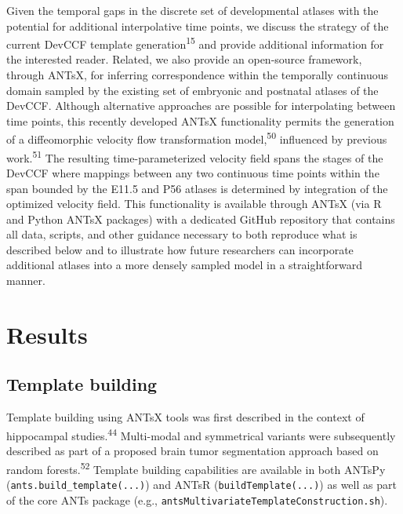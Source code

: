 \documentclass[
  12pt,
]{article}
\begin{document}
Given the temporal gaps in the discrete set of developmental atlases
with the potential for additional interpolative time points, we discuss
the strategy of the current DevCCF template
generation\textsuperscript{15} and provide additional information for
the interested reader. Related, we also provide an open-source
framework, through ANTsX, for inferring correspondence within the
temporally continuous domain sampled by the existing set of embryonic
and postnatal atlases of the DevCCF. Although alternative approaches are
possible for interpolating between time points, this recently developed
ANTsX functionality permits the generation of a diffeomorphic velocity
flow transformation model,\textsuperscript{50} influenced by previous
work.\textsuperscript{51} The resulting time-parameterized velocity
field spans the stages of the DevCCF where mappings between any two
continuous time points within the span bounded by the E11.5 and P56
atlases is determined by integration of the optimized velocity field.
This functionality is available through ANTsX (via R and Python ANTsX
packages) with a dedicated GitHub repository that contains all data,
scripts, and other guidance necessary to both reproduce what is
described below and to illustrate how future researchers can incorporate
additional atlases into a more densely sampled model in a
straightforward manner.

\clearpage
\newpage

\hypertarget{results}{%
\section*{Results}\label{results}}

\hypertarget{template-building}{%
\subsection*{Template building}\label{template-building}}

Template building using ANTsX tools was first described in the context
of hippocampal studies.\textsuperscript{44} Multi-modal and symmetrical
variants were subsequently described as part of a proposed brain tumor
segmentation approach based on random forests.\textsuperscript{52}
Template building capabilities are available in both ANTsPy
(\texttt{ants.build\_template(...)}) and ANTsR
(\texttt{buildTemplate(...)}) as well as part of the core ANTs package
(e.g., \texttt{antsMultivariateTemplateConstruction.sh}).
\end{document}
